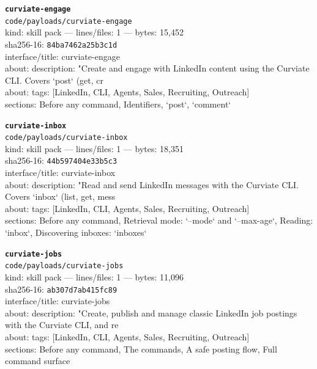 \noindent\textbf{\texttt{curviate-engage}}\\
\texttt{code/payloads/curviate-engage}\\
kind: skill pack --- lines/files: 1 --- bytes: 15,452\\
sha256-16: \texttt{84ba7462a25b3c1d}\\
interface/title: curviate-engage\\
about: description: "Create and engage with LinkedIn content using the Curviate CLI. Covers `post` (get, cr\\
about: tags: [LinkedIn, CLI, Agents, Sales, Recruiting, Outreach]\\
sections: Before any command, Identifiers, `post`, `comment`\\
\vspace*{6.0pt}

\noindent\textbf{\texttt{curviate-inbox}}\\
\texttt{code/payloads/curviate-inbox}\\
kind: skill pack --- lines/files: 1 --- bytes: 18,351\\
sha256-16: \texttt{44b597404e33b5c3}\\
interface/title: curviate-inbox\\
about: description: "Read and send LinkedIn messages with the Curviate CLI. Covers `inbox` (list, get, mess\\
about: tags: [LinkedIn, CLI, Agents, Sales, Recruiting, Outreach]\\
sections: Before any command, Retrieval mode: `--mode` and `--max-age`, Reading: `inbox`, Discovering inboxes: `inboxes`\\
\vspace*{6.0pt}
\newpage

\noindent\textbf{\texttt{curviate-jobs}}\\
\texttt{code/payloads/curviate-jobs}\\
kind: skill pack --- lines/files: 1 --- bytes: 11,096\\
sha256-16: \texttt{ab307d7ab415fc89}\\
interface/title: curviate-jobs\\
about: description: "Create, publish and manage classic LinkedIn job postings with the Curviate CLI, and re\\
about: tags: [LinkedIn, CLI, Agents, Sales, Recruiting, Outreach]\\
sections: Before any command, The commands, A safe posting flow, Full command surface\\
\vspace*{6.0pt}

